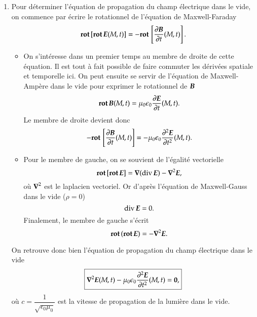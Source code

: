 \begin{corrige}
	\begin{enumerate}
		\item Pour déterminer l'équation de propagation du champ électrique
		  dans le vide, on commence par écrire le rotationnel de 
		  l'équation de Maxwell-Faraday
		  \begin{equation*}
			  \rot[\rot \vece(M, t)] = -\rot\left[\dd{\vecb}{t}(M, t)\right].
		  \end{equation*}
		  \begin{itemize}
		 	 \item On s'intéresse dans un premier temps au membre 
			   de droite de cette équation. Il est tout à fait possible 
			   de faire commuter les dérivées spatiale et temporelle ici.
			   On peut ensuite se servir de l'équation de Maxwell-Ampère
			   dans le vide pour exprimer le rotationnel de $\vecb$
			   \begin{equation*}
				   \rot \vecb(M, t) = \mu_0 \epsilon_0 
				   \dd{\vece}{t}(M, t).
			   \end{equation*}
			   Le membre de droite devient donc
			   \begin{equation*}
				   - \rot\left[\dd{\vecb}{t}(M, t)\right] = 
				   - \mu_0 \epsilon_0 \dd{^2\vece}{t^2}(M, t).
			  \end{equation*}

		  	\item Pour le membre de gauche, on se souvient de l'égalité
			  vectorielle
			  \begin{equation*}
				  \rot[\rot \vece] = \grad(\div \vece) - 
				  \laplacien \vece,
			  \end{equation*}
			  où $\laplacien$ est le laplacien vectoriel. Or d'après
			  l'équation de Maxwell-Gauss dans le vide ($\rho = 0$)
			  \begin{equation*}
				  \div \vece = 0.
			  \end{equation*}
			  Finalement, le membre de gauche s'écrit
			  \begin{equation*}
				  \rot(\rot \vece) = -\laplacien \vece.
			  \end{equation*}
		  \end{itemize}
		  On retrouve donc bien l'équation de propagation du champ électrique
		  dans le vide
		  \begin{equation*}
			  \boxed{
				  \laplacien \vece(M, t) - \mu_0 \epsilon_0
				  \dd{^2 \vece}{t^2}(M, t) = \vec{0},
		  }
		  \end{equation*}
		  où $c = \dfrac{1}{\sqrt{\epsilon_0 \mu_0}}$ est la vitesse
		  de propagation de la lumière dans le vide.


\end{enumerate}
\end{corrige}
